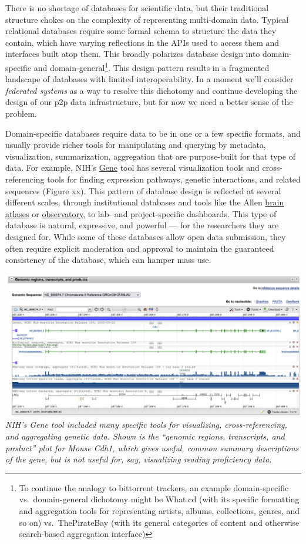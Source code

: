 \documentclass[10pt]{article}
\begin{document}
\begin{multicols}{2}
 There is no shortage of databases for scientific data, but
their traditional structure chokes on the complexity of representing
multi-domain data. Typical relational databases require some formal
schema to structure the data they contain, which have varying
reflections in the APIs used to access them and interfaces built atop
them. This broadly polarizes database design into domain-specific and
domain-general\footnote{To continue the analogy to bittorrent trackers,
  an example domain-specific vs.~domain-general dichotomy might be
  What.cd (with its specific formatting and aggregation tools for
  representing artists, albums, collections, genres, and so on)
  vs.~ThePirateBay (with its general categories of content and otherwise
  search-based aggregation interface)}. This design pattern results in a
fragmented landscape of databases with limited interoperability. In a
moment we'll consider \emph{federated systems} as a way to resolve this
dichotomy and continue developing the design of our p2p data
infrastructure, but for now we need a better sense of the problem.

Domain-specific databases require data to be in one or a few specific
formats, and usually provide richer tools for manipulating and querying
by metadata, visualization, summarization, aggregation that are
purpose-built for that type of data. For example, NIH's
\href{https://www.ncbi.nlm.nih.gov/gene/12550}{Gene} tool has several
visualization tools and cross-referencing tools for finding expression
pathways, genetic interactions, and related sequences (Figure xx). This
pattern of database design is reflected at several different scales,
through institutional databases and tools like the Allen
\href{https://connectivity.brain-map.org/}{brain atlases} or
\href{http://observatory.brain-map.org/visualcoding/}{observatory}, to
lab- and project-specific dashboards. This type of database is natural,
expressive, and powerful --- for the researchers they are designed for.
While some of these databases allow open data submission, they often
require explicit moderation and approval to maintain the guaranteed
consistency of the database, which can hamper mass use.

\includegraphics[width=\linewidth]{../assets/images/nih_gene_cdh1.png}
\emph{NIH's Gene tool included many specific tools for visualizing,
cross-referencing, and aggregating genetic data. Shown is the ``genomic
regions, transcripts, and product'' plot for Mouse Cdh1, which gives
useful, common summary descriptions of the gene, but is not useful for,
say, visualizing reading proficiency data.}


\end{multicols}
\end{document}

